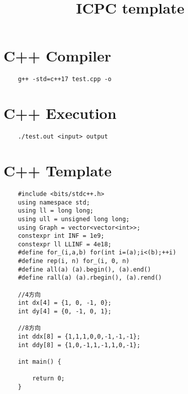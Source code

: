 \documentclass[a4paper, landscape, 9pt]{jarticle} %
\title{\vspace{-4ex}\huge{ICPC template}} %
\author{} %
\date{} %
\begin{document}
\begin{multicols*}{3} %
    \maketitle
    \vspace{-25mm}

    \section*{C++ Compiler}
    \begin{lstlisting}
    g++ -std=c++17 test.cpp -o
    \end{lstlisting}

    \section*{C++ Execution}
    \begin{lstlisting}
    ./test.out <input> output
    \end{lstlisting}

    \section*{C++ Template}
    \begin{lstlisting}
    #include <bits/stdc++.h>
    using namespace std;
    using ll = long long;
    using ull = unsigned long long;
    using Graph = vector<vector<int>>;
    constexpr int INF = 1e9;
    constexpr ll LLINF = 4e18;
    #define for_(i,a,b) for(int i=(a);i<(b);++i)
    #define rep(i, n) for_(i, 0, n)
    #define all(a) (a).begin(), (a).end()
    #define rall(a) (a).rbegin(), (a).rend()

    //4方向
    int dx[4] = {1, 0, -1, 0};
    int dy[4] = {0, -1, 0, 1};

    //8方向
    int ddx[8] = {1,1,1,0,0,-1,-1,-1}; 
    int ddy[8] = {1,0,-1,1,-1,1,0,-1};

    int main() {
        
        return 0;
    }
    \end{lstlisting}


\end{multicols*}
\end{document}
